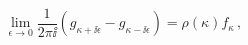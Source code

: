 \begin{equation}
\lim_{\epsilon\to 0} \frac  1{2\pi\ii}(g_{\kappa+\ii\epsilon}-
g_{\kappa-\ii\epsilon})= \rho(\kappa) f_\kappa \,,
\end{equation}

